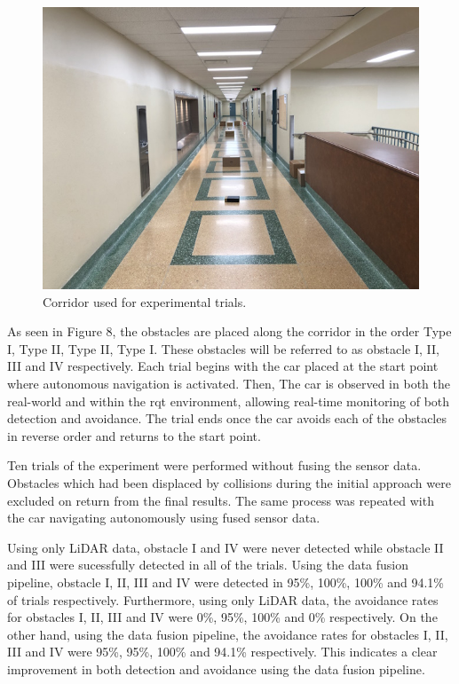 \documentclass[conference]{IEEEtran}
\begin{document}
\begin{figure}
    \centering
    \includegraphics[scale=0.3]{IMG_0506.jpg}
    \caption{Corridor used for experimental trials.}
    \label{Figure 11}
\end{figure}

As seen in Figure 8, the obstacles are placed along the corridor in the order Type I, Type II, Type II, Type I. These obstacles will be referred to as obstacle I, II, III and IV respectively. Each trial begins with the car placed at the start point where autonomous navigation is activated. Then, The car is observed in both the real-world and within the rqt environment, allowing real-time monitoring of both detection and avoidance. The trial ends once the car avoids each of the obstacles in reverse order and returns to the start point. 

Ten trials of the experiment were performed without fusing the sensor data. Obstacles which had been displaced by collisions during the initial approach were excluded on return from the final results. The same process was repeated with the car navigating autonomously using fused sensor data.

Using only LiDAR data, obstacle I and IV were never detected while obstacle II and III were sucessfully detected in all of the trials. Using the data fusion pipeline, obstacle I, II, III and IV were detected in 95\%, 100\%, 100\% and 94.1\%  of trials respectively. Furthermore, using only LiDAR data, the avoidance rates for obstacles I, II, III and IV were 0\%, 95\%, 100\% and 0\% respectively. On the other hand, using the data fusion pipeline, the avoidance rates for obstacles I, II, III and IV were 95\%, 95\%, 100\% and 94.1\% respectively. This indicates a clear improvement in both detection and avoidance using the data fusion pipeline. 
\end{document}
